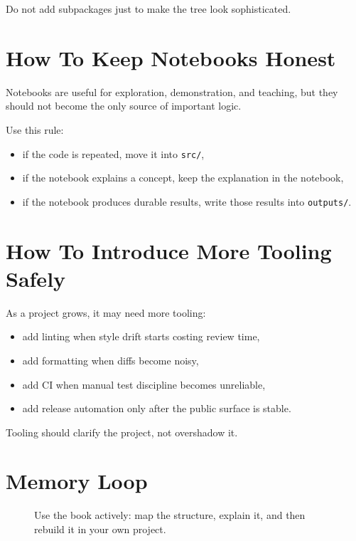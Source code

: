 \documentclass[11pt,oneside]{book}
\begin{document}
Do not add subpackages just to make the tree look sophisticated.

\section*{How To Keep Notebooks Honest}

Notebooks are useful for exploration, demonstration, and teaching, but they should not become the only source of important logic.

Use this rule:
\begin{itemize}
  \item if the code is repeated, move it into \texttt{src/},
  \item if the notebook explains a concept, keep the explanation in the notebook,
  \item if the notebook produces durable results, write those results into \texttt{outputs/}.
\end{itemize}

\section*{How To Introduce More Tooling Safely}

As a project grows, it may need more tooling:
\begin{itemize}
  \item add linting when style drift starts costing review time,
  \item add formatting when diffs become noisy,
  \item add CI when manual test discipline becomes unreliable,
  \item add release automation only after the public surface is stable.
\end{itemize}

Tooling should clarify the project, not overshadow it.

\section*{Memory Loop}
\begin{figure}[H]
\centering
{}
\caption{Use the book actively: map the structure, explain it, and then rebuild it in your own project.}
\end{figure}
\end{document}
